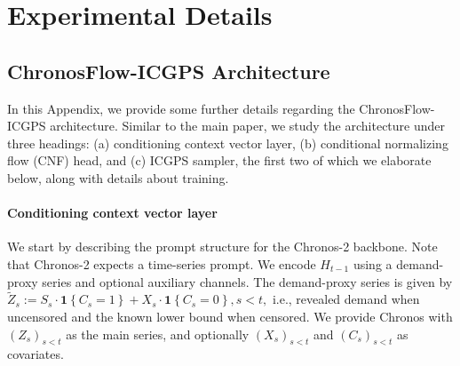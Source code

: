 \documentclass[11pt]{article}
\DeclarePairedDelimiter{\ind}{\mathbf{1}\{}{\}}
\providecommand{\ind}[1]{\mathbf{1}\!\left\{#1\right\}}
\begin{document}
\section{Experimental Details}
\label{app:exp-details}

\subsection{ChronosFlow-ICGPS Architecture}
\label{app:exp-implementation}

In this Appendix, we provide some further details regarding the ChronosFlow-ICGPS architecture. Similar to the main paper, we study the architecture under three headings: (a) conditioning context vector layer, (b) conditional normalizing flow (CNF) head, and (c) ICGPS sampler, the first two of which we elaborate below, along with details about training.


\paragraph{Conditioning context vector layer}
We start by describing the prompt structure for the Chronos-2 backbone. Note that Chronos-2 expects a time-series prompt. We encode $H_{t-1}$ using a demand-proxy series and optional auxiliary channels. The demand-proxy series is given by
\(
\widetilde Z_s := S_s\cdot \ind{C_s=1} + X_s\cdot \ind{C_s=0}, s<t,
\)
i.e., revealed demand when uncensored and the known lower bound when censored. We provide Chronos with $(Z_s)_{s<t}$ as the main series, and optionally $(X_s)_{s<t}$ and $(C_s)_{s<t}$ as covariates.
\end{document}
